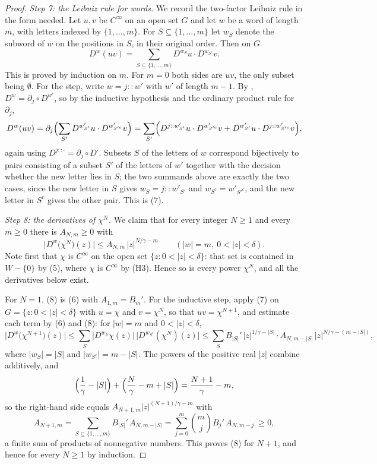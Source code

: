 \begin{proof}
\emph{Step 7: the Leibniz rule for words.}  We record the two-factor Leibniz
rule in the form needed.  Let $u,v$ be $C^\infty$ on an open set $G$ and let
$w$ be a word of length $m$, with letters indexed by $\{1,\dots,m\}$.  For
$S\subseteq\{1,\dots,m\}$ let $w_S$ denote the subword of $w$ on the positions
in $S$, in their original order.  Then on $G$
\begin{equation}\tag{7}
  D^{w}(uv)=\sum_{S\subseteq\{1,\dots,m\}}D^{w_S}u\cdot D^{w_{S^{c}}}v .
\end{equation}
This is proved by induction on $m$.  For $m=0$ both sides are $uv$, the only
subset being $\emptyset$.  For the step, write $w=j\!:\!\!:w'$ with $w'$ of
length $m-1$.  By , $D^{w}=\partial_j\circ D^{w'}$, so by
the inductive hypothesis and the ordinary product rule for $\partial_j$,
\[
  D^{w}(uv)=\partial_j\Bigl(\sum_{S'}D^{w'_{S'}}u\cdot D^{w'_{S'^{c}}}v\Bigr)
  =\sum_{S'}\Bigl(D^{j::w'_{S'}}u\cdot D^{w'_{S'^{c}}}v
    +D^{w'_{S'}}u\cdot D^{j::w'_{S'^{c}}}v\Bigr),
\]
again using $D^{j::\cdot}=\partial_j\circ D^{\cdot}$.  Subsets $S$ of the
letters of $w$ correspond bijectively to pairs consisting of a subset $S'$ of
the letters of $w'$ together with the decision whether the new letter lies in
$S$; the two summands above are exactly the two cases, since the new letter in
$S$ gives $w_S=j\!:\!\!:w'_{S'}$ and $w_{S^{c}}=w'_{S'^{c}}$, and the new
letter in $S^{c}$ gives the other pair.  This is (7).

\emph{Step 8: the derivatives of $\chi^{N}$.}  We claim that for every integer
$N\ge1$ and every $m\ge0$ there is $A_{N,m}\ge0$ with
\begin{equation}\tag{8}
  \bigl|D^{w}\bigl(\chi^{N}\bigr)(z)\bigr|\le A_{N,m}\,|z|^{N/\gamma-m}
  \qquad(|w|=m,\ 0<|z|<\delta).
\end{equation}
Note first that $\chi$ is $C^\infty$ on the open set
$\{z:0<|z|<\delta\}$: that set is contained in $W-\{0\}$ by (5), where $\chi$
is $C^\infty$ by (H3).  Hence so is every power $\chi^{N}$, and all the
derivatives below exist.

For $N=1$, (8) is (6) with $A_{1,m}=B_m'$.  For the inductive step, apply (7)
on $G=\{z:0<|z|<\delta\}$ with $u=\chi$ and $v=\chi^{N}$, so that
$uv=\chi^{N+1}$, and estimate each term by (6) and (8): for $|w|=m$ and
$0<|z|<\delta$,
\[
  \bigl|D^{w}\bigl(\chi^{N+1}\bigr)(z)\bigr|
  \le\sum_{S}\bigl|D^{w_S}\chi(z)\bigr|\,\bigl|D^{w_{S^{c}}}(\chi^{N})(z)\bigr|
  \le\sum_{S}B_{|S|}'\,|z|^{1/\gamma-|S|}\cdot A_{N,m-|S|}\,|z|^{N/\gamma-(m-|S|)},
\]
where $|w_S|=|S|$ and $|w_{S^{c}}|=m-|S|$.  The powers of the positive real
$|z|$ combine additively, and
\[
  \Bigl(\frac1\gamma-|S|\Bigr)+\Bigl(\frac N\gamma-m+|S|\Bigr)
  =\frac{N+1}{\gamma}-m ,
\]
so the right-hand side equals $A_{N+1,m}|z|^{(N+1)/\gamma-m}$ with
\[
  A_{N+1,m}=\sum_{S\subseteq\{1,\dots,m\}}B_{|S|}'\,A_{N,m-|S|}
  =\sum_{j=0}^{m}\binom{m}{j}B_j'\,A_{N,m-j}\ \ge0,
\]
a finite sum of products of nonnegative numbers.  This proves (8) for $N+1$,
and hence for every $N\ge1$ by induction.


\end{proof}
